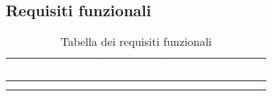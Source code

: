 \subsection{Requisiti funzionali}
\renewcommand{\arraystretch}{1.5}
\begin{center}
\begin{longtable}{C{\colA} C{\colB} C{\colC} C{\colA}}
		\textcolor{white}{\textbf{Codice}} & 
		\textcolor{white}{\textbf{Classificazione}} & 
		\textcolor{white}{\textbf{Descrizione}} & 
		\textcolor{white}{\textbf{Fonti}} \\
		\endfirsthead
	    \\
	    \endfoot
	    \caption{Tabella dei requisiti funzionali}
	    \endlastfoot


\end{longtable}
\end{center}
